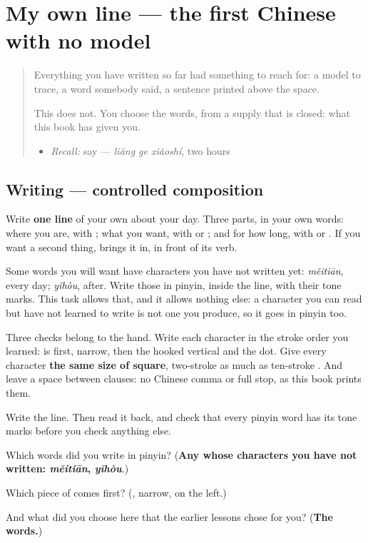 \section[(my own line)]{My own line — the first Chinese with no model}

\label{lesson:ZH-W97-my-own-line}



\begin{quote}
Everything you have written so far had something to reach for: a model to trace, a word somebody said, a sentence printed above the space.

This does not. You choose the words, from a supply that is closed: what this book has given you.

\begin{itemize}
\raggedright
  \item \emph{Recall:} say  — \emph{liǎng ge xiǎoshí}, two hours
\end{itemize}
\end{quote}

\subsection*{Writing — controlled composition}
Write \textbf{one line} of your own about your day. Three parts, in your own words: where you are, with ; what you want, with  or ; and for how long, with  or . If you want a second thing,  brings it in, in front of its verb.

Some words you will want have characters you have not written yet: \emph{měitiān}, every day; \emph{yǐhòu}, after. Write those in pinyin, inside the line, with their tone marks. This task allows that, and it allows nothing else: a character you can read but have not learned to write is not one you produce, so it goes in pinyin too.

Three checks belong to the hand. Write each character in the stroke order you learned:  is  first, narrow, then the hooked vertical and the dot. Give every character \textbf{the same size of square}, two-stroke  as much as ten-stroke . And leave a space between clauses: no Chinese comma or full stop, as this book prints them.

Write the line. Then read it back, and check that every pinyin word has its tone marks before you check anything else.

\begin{tcolorbox}[breakable,colback=teal!4,colframe=teal!35!black,title={Before you move on}]
Which words did you write in pinyin? (\textbf{Any whose characters you have not written: \emph{měitiān}, \emph{yǐhòu}}.)

Which piece of  comes first? (\textbf{}, narrow, on the left.)

And what did you choose here that the earlier lessons chose for you? (\textbf{The words.})
\end{tcolorbox}
